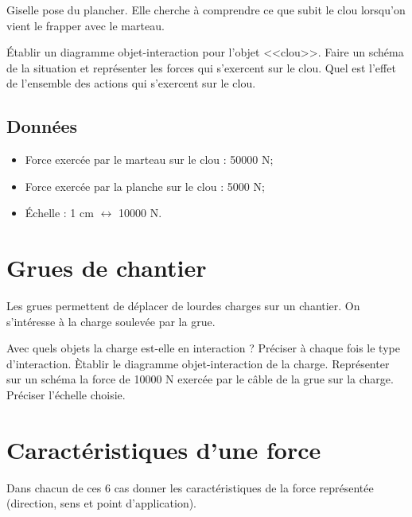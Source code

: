\documentclass[a4paper,11pt]{exam}
\begin{document}
Giselle pose du plancher. Elle cherche à comprendre ce que subit le clou lorsqu'on vient le frapper avec le marteau.

\begin{questions}
	\question \'Etablir un diagramme objet-interaction pour l'objet <<clou>>.
	\question Faire un schéma de la situation et représenter les forces qui s'exercent sur le clou.
	\question Quel est l'effet de l'ensemble des actions qui s'exercent sur le clou.
	
\end{questions}

\subsection*{Données}
	\begin{itemize}
		\item Force exercée par le marteau sur le clou : \num{50000} N;
		\item Force exercée par la planche sur le clou : \num{5000} N;
		\item \'Echelle : 1 cm $\leftrightarrow$ \num{10000} N.
	\end{itemize}

\section{Grues de chantier}

Les grues permettent de déplacer de lourdes charges sur un chantier. On s'intéresse à la charge soulevée par la grue.

\begin{questions}
	\question Avec quels objets la charge est-elle en interaction ? Préciser à chaque fois le type d'interaction.
	\question Ètablir le diagramme objet-interaction de la charge.
	\question Représenter sur un schéma la force de \num{10000} N exercée par le câble de la grue sur la charge. Préciser l'échelle choisie.
\end{questions}


\newpage 

\section{Caractéristiques d'une force}

Dans chacun de ces 6 cas donner les caractéristiques de la force représentée (direction, sens et point d'application).
\end{document}
